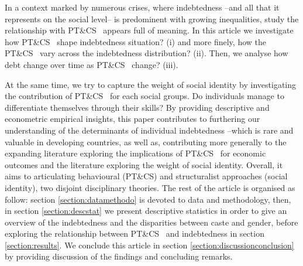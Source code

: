 \documentclass[a4paper, 12pt, onecolumn]{article}
\newcommand{\PTCS}{PT\&CS}
\begin{document}


In a context marked by numerous crises, where indebtedness --and all that it represents on the social level-- is predominent with growing inequalities, study the relationship with \PTCS~ appears full of meaning.
In this article we investigate how \PTCS~ shape indebtedness situation? (i) and more finely, how the \PTCS~ vary across the indebtedness distribution? (ii).
Then, we analyse how debt change over time as \PTCS~ change? (iii).%

At the same time, we try to capture the weight of social identity by investigating the contribution of \PTCS~ for each social groups.
Do individuals manage to differentiate themselves through their skills?
By providing descriptive and econometric empirical insights, this paper contributes to furthering our understanding of the determinants of individual indebtedness --which is rare and valuable in developing countries, as well as, contributing more generally to the expanding literature exploring the implications of \PTCS~ for economic outcomes and the literature exploring the weight of social identity.
Overall, it aims to articulating behavioural (\PTCS) and structuralist approaches (social identity), two disjoint disciplinary theories.
The rest of the article is organised as follow: section \ref{section:datamethodo} is devoted to data and methodology, then, in section \ref{section:descstat} we present descriptive statistics in order to give an overview of the indebtedness and the disparities between caste and gender, before exploring the relationship between \PTCS~ and indebtedness in section \ref{section:results}.
We conclude this article in section \ref{section:discussionconclusion} by providing discussion of the findings and concluding remarks.
\end{document}
